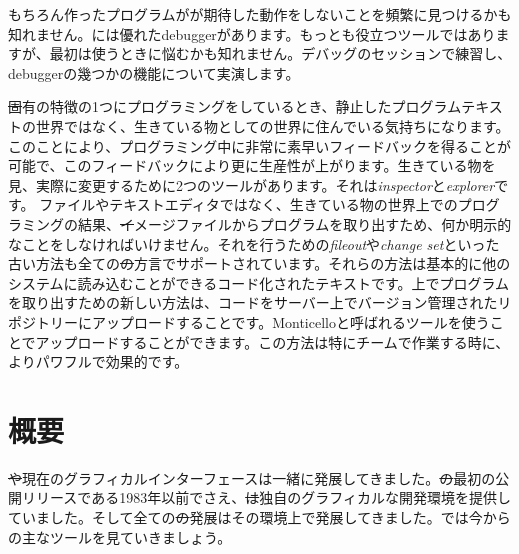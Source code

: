 \documentclass[a4paper,10pt,twoside]{book}
\begin{document}
もちろん作ったプログラムがが期待した動作をしないことを頻繁に見つけるかも知れません。\pharo には優れたdebuggerがあります。もっとも役立つツールではありますが、最初は使うときに悩むかも知れません。デバッグのセッションで練習し、debuggerの幾つかの機能について実演します。

\st 固有の特徴の1つにプログラミングをしているとき、静止したプログラムテキストの世界ではなく、生きている物としての世界に住んでいる気持ちになります。このことにより、プログラミング中に非常に素早いフィードバックを得ることが可能で、このフィードバックにより更に生産性が上がります。生きている物を見、実際に変更するために2つのツールがあります。それは\emph{inspector}と\emph{explorer}です。
ファイルやテキストエディタではなく、生きている物の世界上でのプログラミングの結果、\st イメージファイルからプログラムを取り出すため、何か明示的なことをしなければいけません。それを行うための\emph{fileout}や\emph{change set}といった古い方法も全ての\st の方言でサポートされています。それらの方法は基本的に他のシステムに読み込むことができるコード化されたテキストです。\pharo 上でプログラムを取り出すための新しい方法は、コードをサーバー上でバージョン管理されたリポジトリーにアップロードすることです。Monticelloと呼ばれるツールを使うことでアップロードすることができます。この方法は特にチームで作業する時に、よりパワフルで効果的です。


\section{概要}

\st や現在のグラフィカルインターフェースは一緒に発展してきました。\st の最初の公開リリースである1983年以前でさえ、\st は独自のグラフィカルな開発環境を提供していました。そして全ての\st の発展はその環境上で発展してきました。では今から\pharo の主なツールを見ていきましょう。
\end{document}
